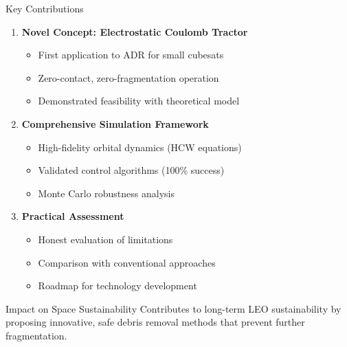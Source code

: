 \documentclass[aspectratio=169]{beamer}
\begin{document}
\begin{frame}{Key Contributions}
\begin{enumerate}
    \item \textbf{Novel Concept: Electrostatic Coulomb Tractor}
    \begin{itemize}
        \item First application to ADR for small cubesats
        \item Zero-contact, zero-fragmentation operation
        \item Demonstrated feasibility with theoretical model
    \end{itemize}

    \item \textbf{Comprehensive Simulation Framework}
    \begin{itemize}
        \item High-fidelity orbital dynamics (HCW equations)
        \item Validated control algorithms (100\% success)
        \item Monte Carlo robustness analysis
    \end{itemize}

    \item \textbf{Practical Assessment}
    \begin{itemize}
        \item Honest evaluation of limitations
        \item Comparison with conventional approaches
        \item Roadmap for technology development
    \end{itemize}
\end{enumerate}

\vspace{1em}
\begin{block}{Impact on Space Sustainability}
Contributes to long-term LEO sustainability by proposing innovative, safe debris removal methods that prevent further fragmentation.
\end{block}
\end{frame}
\end{document}
